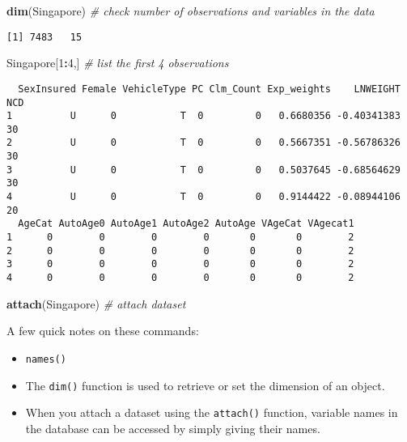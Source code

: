 \documentclass[]{book}
\newenvironment{Shaded}{\begin{snugshade}}{\end{snugshade}}
\newcommand{\KeywordTok}[1]{\textcolor[rgb]{0.13,0.29,0.53}{\textbf{#1}}}
\newcommand{\DecValTok}[1]{\textcolor[rgb]{0.00,0.00,0.81}{#1}}
\newcommand{\CommentTok}[1]{\textcolor[rgb]{0.56,0.35,0.01}{\textit{#1}}}
\newcommand{\OperatorTok}[1]{\textcolor[rgb]{0.81,0.36,0.00}{\textbf{#1}}}
\newcommand{\NormalTok}[1]{#1}
\providecommand{\tightlist}{%
  \setlength{\itemsep}{0pt}\setlength{\parskip}{0pt}}
\theoremstyle{definition}
\theoremstyle{definition}
\theoremstyle{definition}
\theoremstyle{remark}
\begin{document}
\begin{Shaded}
\begin{Highlighting}[]
\KeywordTok{dim}\NormalTok{(Singapore)  }\CommentTok{# check number of observations and variables in the data}
\end{Highlighting}
\end{Shaded}

\begin{verbatim}
[1] 7483   15
\end{verbatim}

\begin{Shaded}
\begin{Highlighting}[]
\NormalTok{Singapore[}\DecValTok{1}\OperatorTok{:}\DecValTok{4}\NormalTok{,]  }\CommentTok{# list the first 4 observations}
\end{Highlighting}
\end{Shaded}

\begin{verbatim}
  SexInsured Female VehicleType PC Clm_Count Exp_weights    LNWEIGHT NCD
1          U      0           T  0         0   0.6680356 -0.40341383  30
2          U      0           T  0         0   0.5667351 -0.56786326  30
3          U      0           T  0         0   0.5037645 -0.68564629  30
4          U      0           T  0         0   0.9144422 -0.08944106  20
  AgeCat AutoAge0 AutoAge1 AutoAge2 AutoAge VAgeCat VAgecat1
1      0        0        0        0       0       0        2
2      0        0        0        0       0       0        2
3      0        0        0        0       0       0        2
4      0        0        0        0       0       0        2
\end{verbatim}

\begin{Shaded}
\begin{Highlighting}[]
\KeywordTok{attach}\NormalTok{(Singapore)  }\CommentTok{# attach dataset}
\end{Highlighting}
\end{Shaded}

A few quick notes on these commands:

\begin{itemize}
\tightlist
\item
  \texttt{names()}
\item
  The \texttt{dim()} function is used to retrieve or set the dimension
  of an object.
\item
  When you attach a dataset using the \texttt{attach()} function,
  variable names in the database can be accessed by simply giving their
  names.
\end{itemize}
\end{document}
